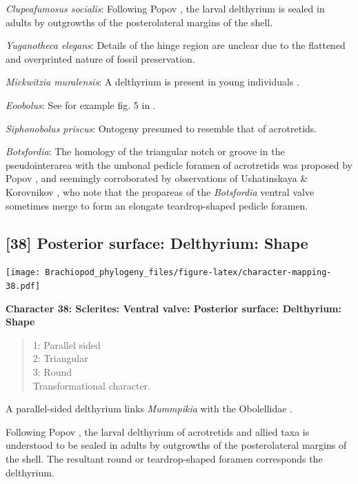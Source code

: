 \documentclass[]{book}
\theoremstyle{definition}
\theoremstyle{definition}
\theoremstyle{definition}
\theoremstyle{remark}
\begin{document}
\emph{Clupeafumosus socialis}: Following Popov
\citeyearpar{Popov1992TheCambrian}, the larval delthyrium is sealed in
adults by outgrowths of the posterolateral margins of the shell.

\emph{Yuganotheca elegans}: Details of the hinge region are unclear due
to the flattened and overprinted nature of fossil preservation.

\emph{Mickwitzia muralensis}: A delthyrium is present in young
individuals \citep{Balthasar2004Shellstructure}.

\emph{Eoobolus}: See for example fig. 5 in
\citet{Balthasar2009Thebrachiopod}.

\emph{Siphonobolus priscus}: Ontogeny presumed to resemble that of
acrotretids.

\emph{Botsfordia}: The homology of the triangular notch or groove in the
pseudointerarea with the umbonal pedicle foramen of acrotretids was
proposed by Popov \citeyearpar{Popov1992TheCambrian}, and seemingly
corroborated by observations of Ushatinskaya \& Korovnikov
\citeyearpar{Ushatinskaya2016Revisionof}, who note that the propareas of
the \emph{Botsfordia} ventral valve sometimes merge to form an elongate
teardrop-shaped pedicle foramen.

\hypertarget{posterior-surface-delthyrium-shape}{%
\subsection*{{[}38{]} Posterior surface: Delthyrium:
Shape}\label{posterior-surface-delthyrium-shape}}

\texttt{[image: Brachiopod\_phylogeny\_files/figure-latex/character-mapping-38.pdf]}

\textbf{Character 38: Sclerites: Ventral valve: Posterior surface:
Delthyrium: Shape}

\begin{quote}
1: Parallel sided\\
2: Triangular\\
3: Round\\
Transformational character.
\end{quote}

A parallel-sided delthyrium links \emph{Mummpikia} with the Obolellidae
\citep{Balthasar2008iMummpikia}.

Following Popov \citeyearpar{Popov1992TheCambrian}, the larval
delthyrium of acrotretids and allied taxa is understood to be sealed in
adults by outgrowths of the posterolateral margins of the shell. The
resultant round or teardrop-shaped foramen corresponds the delthyrium.
\end{document}
